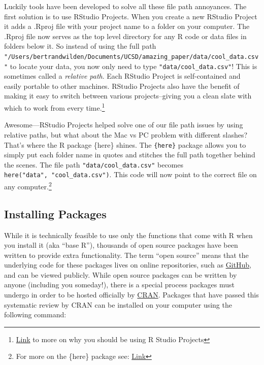 \documentclass[
  letterpaper,
]{book}
\theoremstyle{definition}
\theoremstyle{definition}
\theoremstyle{plain}
\theoremstyle{definition}
\theoremstyle{plain}
\theoremstyle{plain}
\theoremstyle{remark}
\begin{document}
Luckily tools have been developed to solve all these file path
annoyances. The first solution is to use RStudio Projects. When you
create a new RStudio Project it adds a .Rproj file with your project
name to a folder on your computer. The .Rproj file now serves as the top
level directory for any R code or data files in folders below it. So
instead of using the full path
\texttt{"/Users/bertrandwilden/Documents/UCSD/amazing\_paper/data/cool\_data.csv"}
to locate your data, you now only need to type
\texttt{"data/cool\_data.csv"}! This is sometimes called a
\emph{relative path}. Each RStudio Project is self-contained and easily
portable to other machines. RStudio Projects also have the benefit of
making it easy to switch between various projects--giving you a clean
slate with which to work from every time.\footnote{\href{https://www.tidyverse.org/blog/2017/12/workflow-vs-script/}{Link}
  to more on why you should be using R Studio Projects}

Awesome---RStudio Projects helped solve one of our file path issues by
using relative paths, but what about the Mac vs PC problem with
different slashes? That's where the R package \{here\} shines. The
\texttt{\{here\}} package allows you to simply put each folder name in
quotes and stitches the full path together behind the scenes. The file
path \texttt{"data/cool\_data.csv"} becomes
\texttt{here("data",\ "cool\_data.csv")}. This code will now point to
the correct file on any computer.\footnote{For more on the \{here\}
  package see: \href{https://github.com/jennybc/here_here}{Link}}

\hypertarget{installing-packages}{%
\subsection{Installing Packages}\label{installing-packages}}

While it is technically feasible to use only the functions that come
with R when you install it (aka ``base R''), thousands of open source
packages have been written to provide extra functionality. The term
``open source'' means that the underlying code for these packages lives
on online repositories, such as \href{https://github.com/}{GitHub}, and
can be viewed publicly. While open source packages can be written by
anyone (including you someday!), there is a special process packages
must undergo in order to be hosted officially by
\href{https://cran.r-project.org/}{CRAN}. Packages that have passed this
systematic review by CRAN can be installed on your computer using the
following command:
\end{document}
